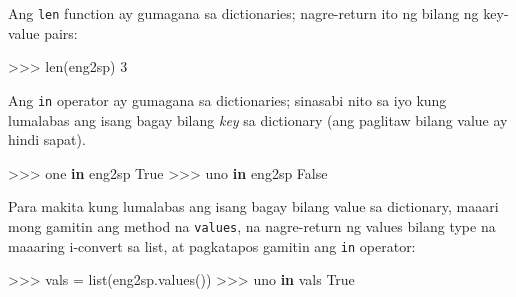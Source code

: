 \documentclass[10pt,]{book}
\newenvironment{Shaded}{}{}
\newcommand{\BuiltInTok}[1]{\textcolor[rgb]{0.00,0.50,0.00}{#1}}
\newcommand{\DecValTok}[1]{\textcolor[rgb]{0.25,0.63,0.44}{#1}}
\newcommand{\KeywordTok}[1]{\textcolor[rgb]{0.00,0.44,0.13}{\textbf{#1}}}
\newcommand{\NormalTok}[1]{#1}
\newcommand{\OperatorTok}[1]{\textcolor[rgb]{0.40,0.40,0.40}{#1}}
\newcommand{\StringTok}[1]{\textcolor[rgb]{0.25,0.44,0.63}{#1}}
\newcommand{\VariableTok}[1]{\textcolor[rgb]{0.10,0.09,0.49}{#1}}
\begin{document}
Ang \texttt{len} function ay gumagana sa dictionaries; nagre-return ito
ng bilang ng key-value pairs:

 

\begin{Shaded}
\begin{Highlighting}[]
\OperatorTok{\textgreater{}\textgreater{}\textgreater{}} \BuiltInTok{len}\NormalTok{(eng2sp)}
\DecValTok{3}
\end{Highlighting}
\end{Shaded}

Ang \texttt{in} operator ay gumagana sa dictionaries; sinasabi nito sa
iyo kung lumalabas ang isang bagay bilang \emph{key} sa dictionary (ang
paglitaw bilang value ay hindi sapat).

  

\begin{Shaded}
\begin{Highlighting}[]
\OperatorTok{\textgreater{}\textgreater{}\textgreater{}} \StringTok{\textquotesingle{}one\textquotesingle{}} \KeywordTok{in}\NormalTok{ eng2sp}
\VariableTok{True}
\OperatorTok{\textgreater{}\textgreater{}\textgreater{}} \StringTok{\textquotesingle{}uno\textquotesingle{}} \KeywordTok{in}\NormalTok{ eng2sp}
\VariableTok{False}
\end{Highlighting}
\end{Shaded}

Para makita kung lumalabas ang isang bagay bilang value sa dictionary,
maaari mong gamitin ang method na \texttt{values}, na nagre-return ng
values bilang type na maaaring i-convert sa list, at pagkatapos gamitin
ang \texttt{in} operator:

 

\begin{Shaded}
\begin{Highlighting}[]
\OperatorTok{\textgreater{}\textgreater{}\textgreater{}}\NormalTok{ vals }\OperatorTok{=} \BuiltInTok{list}\NormalTok{(eng2sp.values())}
\OperatorTok{\textgreater{}\textgreater{}\textgreater{}} \StringTok{\textquotesingle{}uno\textquotesingle{}} \KeywordTok{in}\NormalTok{ vals}
\VariableTok{True}
\end{Highlighting}
\end{Shaded}
\end{document}

